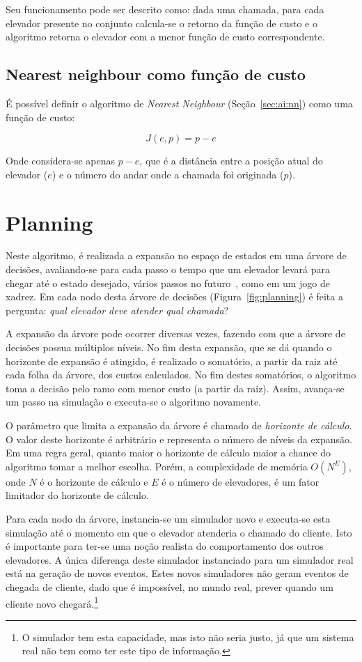 Seu funcionamento pode ser descrito como: dada uma chamada, para cada elevador
presente no conjunto calcula-se o retorno da função de custo e o algoritmo
retorna o elevador com a menor função de custo correspondente.

\subsection{Nearest neighbour como função de custo}

É possível definir o algoritmo de \textit{Nearest Neighbour}
(Seção~\ref{sec:ai:nn}) como uma função de custo:

\[J(e, p) = p - e\]

Onde considera-se apenas $p - e$, que é a distância entre a posição atual do
elevador ($e$) e o número do andar onde a chamada foi originada ($p$).

\section{\label{sec:ai:planning}Planning}

Neste algoritmo, é realizada a expansão no espaço de estados em uma árvore de
decisões, avaliando-se para cada passo o tempo que um elevador levará para
chegar até o estado desejado, vários passos no
futuro~\cite{Koehler00elevatorcontrol}, como em um jogo de xadrez. Em cada nodo
desta árvore de decisões (Figura~\ref{fig:planning}) é feita a pergunta:
\textit{qual elevador deve atender qual chamada}?

A expansão da árvore pode ocorrer diversas vezes, fazendo com que a árvore de
decisões possua múltiplos níveis. No fim desta expansão, que se dá quando
o horizonte de expansão é atingido, é realizado o somatório, a partir da raiz até
cada folha da árvore, dos custos calculados. No fim destes somatórios, o
algoritmo toma a decisão pelo ramo com menor custo (a partir da raiz). Assim,
avança-se um passo na simulação e executa-se o algoritmo novamente.

O parâmetro que limita a expansão da árvore é chamado de \textit{horizonte de
cálculo}. O valor deste horizonte é arbitrário e representa o número de níveis
da expansão. Em uma regra geral, quanto maior o horizonte de cálculo maior a
chance do algoritmo tomar a melhor escolha. Porém, a complexidade de memória
$O(N^{E})$, onde $N$ é o horizonte de cálculo e $E$ é o número de elevadores,
é um fator limitador do horizonte de cálculo.

Para cada nodo da árvore, instancia-se um simulador novo e executa-se esta
simulação até o momento em que o elevador atenderia o chamado do cliente. Isto é
importante para ter-se uma noção realista do comportamento dos outros
elevadores. A única diferença deste simulador instanciado para um simulador real
está na geração de novos eventos. Estes novos simuladores não geram eventos de
chegada de cliente, dado que é impossível, no mundo real, prever quando um
cliente novo chegará.\footnote{O simulador tem esta capacidade, mas isto não
  seria justo, já que um sistema real não tem como ter este tipo de informação.}

